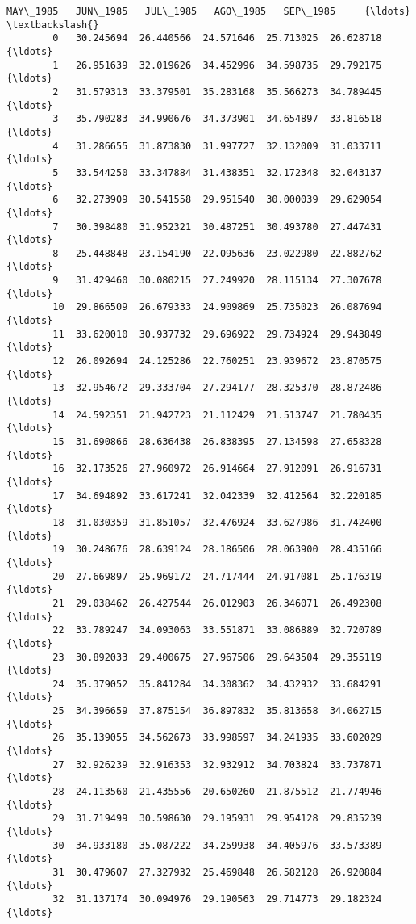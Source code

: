 \documentclass[11pt]{article}
\begin{document}
\begin{Verbatim}[commandchars=\\\{\}]
             MAY\_1985   JUN\_1985   JUL\_1985   AGO\_1985   SEP\_1985     {\ldots}      \textbackslash{}
        0   30.245694  26.440566  24.571646  25.713025  26.628718     {\ldots}       
        1   26.951639  32.019626  34.452996  34.598735  29.792175     {\ldots}       
        2   31.579313  33.379501  35.283168  35.566273  34.789445     {\ldots}       
        3   35.790283  34.990676  34.373901  34.654897  33.816518     {\ldots}       
        4   31.286655  31.873830  31.997727  32.132009  31.033711     {\ldots}       
        5   33.544250  33.347884  31.438351  32.172348  32.043137     {\ldots}       
        6   32.273909  30.541558  29.951540  30.000039  29.629054     {\ldots}       
        7   30.398480  31.952321  30.487251  30.493780  27.447431     {\ldots}       
        8   25.448848  23.154190  22.095636  23.022980  22.882762     {\ldots}       
        9   31.429460  30.080215  27.249920  28.115134  27.307678     {\ldots}       
        10  29.866509  26.679333  24.909869  25.735023  26.087694     {\ldots}       
        11  33.620010  30.937732  29.696922  29.734924  29.943849     {\ldots}       
        12  26.092694  24.125286  22.760251  23.939672  23.870575     {\ldots}       
        13  32.954672  29.333704  27.294177  28.325370  28.872486     {\ldots}       
        14  24.592351  21.942723  21.112429  21.513747  21.780435     {\ldots}       
        15  31.690866  28.636438  26.838395  27.134598  27.658328     {\ldots}       
        16  32.173526  27.960972  26.914664  27.912091  26.916731     {\ldots}       
        17  34.694892  33.617241  32.042339  32.412564  32.220185     {\ldots}       
        18  31.030359  31.851057  32.476924  33.627986  31.742400     {\ldots}       
        19  30.248676  28.639124  28.186506  28.063900  28.435166     {\ldots}       
        20  27.669897  25.969172  24.717444  24.917081  25.176319     {\ldots}       
        21  29.038462  26.427544  26.012903  26.346071  26.492308     {\ldots}       
        22  33.789247  34.093063  33.551871  33.086889  32.720789     {\ldots}       
        23  30.892033  29.400675  27.967506  29.643504  29.355119     {\ldots}       
        24  35.379052  35.841284  34.308362  34.432932  33.684291     {\ldots}       
        25  34.396659  37.875154  36.897832  35.813658  34.062715     {\ldots}       
        26  35.139055  34.562673  33.998597  34.241935  33.602029     {\ldots}       
        27  32.926239  32.916353  32.932912  34.703824  33.737871     {\ldots}       
        28  24.113560  21.435556  20.650260  21.875512  21.774946     {\ldots}       
        29  31.719499  30.598630  29.195931  29.954128  29.835239     {\ldots}       
        30  34.933180  35.087222  34.259938  34.405976  33.573389     {\ldots}       
        31  30.479607  27.327932  25.469848  26.582128  26.920884     {\ldots}       
        32  31.137174  30.094976  29.190563  29.714773  29.182324     {\ldots}       
        

\end{Verbatim}
\end{document}
